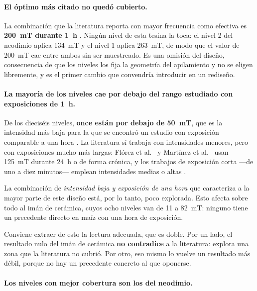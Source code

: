 \paragraph{El óptimo más citado no quedó cubierto.}

La combinación que la literatura reporta con mayor frecuencia como efectiva es \textbf{200~mT durante 1~h} \cite{shine_guruprasad_2012, vashisth_joshi_2017, shine_2017, kataria_2017}. Ningún nivel de esta tesina la toca: el nivel 2 del neodimio aplica 134~mT y el nivel 1 aplica 263~mT, de modo que el valor de 200~mT cae entre ambos sin ser muestreado. Es una omisión del diseño, consecuencia de que los niveles los fija la geometría del apilamiento y no se eligen libremente, y es el primer cambio que convendría introducir en un rediseño.

\paragraph{La mayoría de los niveles cae por debajo del rango estudiado con exposiciones de 1~h.}

De los dieciséis niveles, \textbf{once están por debajo de 50~mT}, que es la intensidad más baja para la que se encontró un estudio con exposición comparable a una hora \cite{shine_2017}. La literatura sí trabaja con intensidades menores, pero con exposiciones mucho más largas: Flórez et al.~\cite{florez_2007} y Martínez et al.~\cite{martinez_2017} usan 125~mT durante 24~h o de forma crónica, y los trabajos de exposición corta ---de uno a diez minutos--- emplean intensidades medias o altas \cite{torres_2019, torres_socorro_2018, siyami_2018}.

La combinación de \emph{intensidad baja y exposición de una hora} que caracteriza a la mayor parte de este diseño está, por lo tanto, poco explorada. Esto afecta sobre todo al imán de cerámica, cuyos ocho niveles van de 11 a 82~mT: ninguno tiene un precedente directo en maíz con una hora de exposición.

Conviene extraer de esto la lectura adecuada, que es doble. Por un lado, el resultado nulo del imán de cerámica \textbf{no contradice} a la literatura: explora una zona que la literatura no cubrió. Por otro, eso mismo lo vuelve un resultado más débil, porque no hay un precedente concreto al que oponerse.

\paragraph{Los niveles con mejor cobertura son los del neodimio.}

